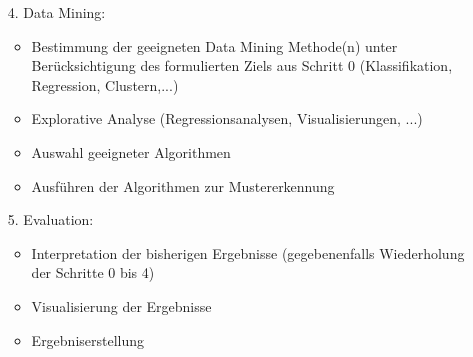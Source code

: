 \begin{frame}
\begin{enumerate}[<+->]
\item[4.] Data Mining:
\begin{itemize}[<+->]
\item Bestimmung der geeigneten Data Mining Methode(n) unter Berücksichtigung des formulierten Ziels aus Schritt $0$ (Klassifikation, Regression, Clustern,...)
\item Explorative Analyse (Regressionsanalysen, Visualisierungen, ...)
\item Auswahl geeigneter Algorithmen
\item Ausführen der Algorithmen zur Mustererkennung
\end{itemize}
\item[5.] Evaluation: 
\begin{itemize}[<+->]
\item Interpretation der bisherigen Ergebnisse (gegebenenfalls Wiederholung der Schritte 0 bis 4)
\item Visualisierung der Ergebnisse
\item Ergebniserstellung
\end{itemize}
\end{enumerate}
\end{frame}

